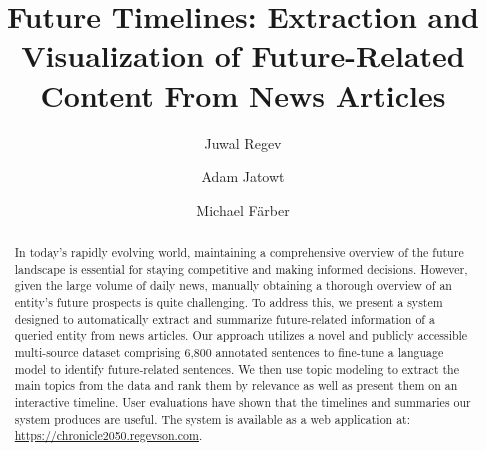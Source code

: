 \documentclass[sigconf]{acmart}
\begin{document}
\title{Future Timelines: Extraction and Visualization of Future-Related Content From News Articles}

\author{Juwal Regev}

\author{Adam Jatowt}

\author{Michael Färber}

\renewcommand{\shortauthors}{Juwal Regev, Adam Jatowt, \& Michael Färber}


\begin{abstract}
In today's rapidly evolving world, maintaining a comprehensive overview of the future landscape is essential for staying competitive and making informed decisions. 
However, given the large volume of daily news, manually obtaining a thorough overview of an entity's future prospects is quite challenging. 
To address this, we present a system designed to automatically extract and summarize future-related information of a queried entity from news articles.
Our approach utilizes a novel and publicly accessible multi-source dataset comprising 6,800 annotated sentences to fine-tune a language model to identify future-related sentences.
We then use topic modeling to extract the main topics from the data and rank them by relevance as well as present them on an interactive timeline. 
User evaluations have shown that the timelines and summaries our system produces are useful. The system is available as a web application at: \url{https://chronicle2050.regevson.com}.
\end{abstract}
\end{document}
